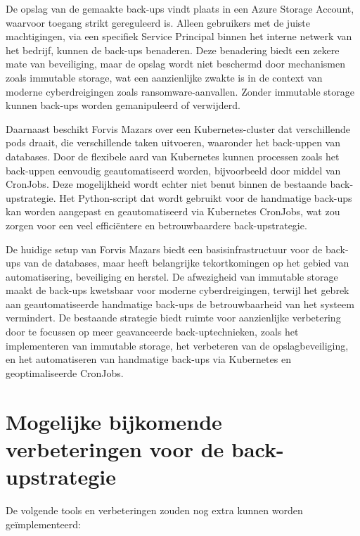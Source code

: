 De opslag van de gemaakte back-ups vindt plaats in een Azure Storage Account, waarvoor toegang strikt gereguleerd is. Alleen gebruikers met de juiste machtigingen, via een specifiek Service Principal binnen het interne netwerk van het bedrijf, kunnen de back-ups benaderen. Deze benadering biedt een zekere mate van beveiliging, maar de opslag wordt niet beschermd door mechanismen zoals immutable storage, wat een aanzienlijke zwakte is in de context van moderne cyberdreigingen zoals ransomware-aanvallen. Zonder immutable storage kunnen back-ups worden gemanipuleerd of verwijderd.

Daarnaast beschikt Forvis Mazars over een Kubernetes-cluster dat verschillende pods draait, die verschillende taken uitvoeren, waaronder het back-uppen van databases. Door de flexibele aard van Kubernetes kunnen processen zoals het back-uppen eenvoudig geautomatiseerd worden, bijvoorbeeld door middel van CronJobs. Deze mogelijkheid wordt echter niet benut binnen de bestaande back-upstrategie. Het Python-script dat wordt gebruikt voor de handmatige back-ups kan worden aangepast en geautomatiseerd via Kubernetes CronJobs, wat zou zorgen voor een veel efficiëntere en betrouwbaardere back-upstrategie.

De huidige setup van Forvis Mazars biedt een basisinfrastructuur voor de back-ups van de databases, maar heeft belangrijke tekortkomingen op het gebied van automatisering, beveiliging en herstel. De afwezigheid van immutable storage maakt de back-ups kwetsbaar voor moderne cyberdreigingen, terwijl het gebrek aan geautomatiseerde handmatige back-ups de betrouwbaarheid van het systeem vermindert. De bestaande strategie biedt ruimte voor aanzienlijke verbetering door te focussen op meer geavanceerde back-uptechnieken, zoals het implementeren van immutable storage, het verbeteren van de opslagbeveiliging, en het automatiseren van handmatige back-ups via Kubernetes en geoptimaliseerde CronJobs.
\section{Mogelijke bijkomende verbeteringen voor de back-upstrategie}
De volgende tools en verbeteringen zouden nog extra kunnen worden geïmplementeerd:

